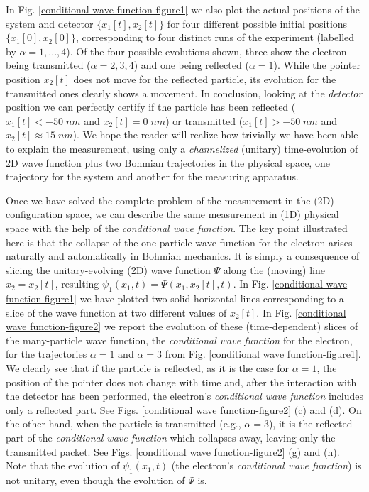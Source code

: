 \documentclass[nofootinbib, secnumarabic, amsmath, nobibnotes,11pt,aps,pra, floatfix]{revtex4-1}
\newcommand{\fref}[1]{Fig. \ref{#1}}
\begin{document}
In \fref{conditional wave function-figure1} we also plot the actual positions of the system and detector $\{x_1[t],x_2[t]\}$ for four different possible initial positions $\{x_1[0], x_2[0]\}$, corresponding to four distinct runs of the experiment (labelled by $\alpha=1,...,4$). Of the four possible evolutions shown, three show the electron being transmitted ($\alpha=2,3,4$) and one being reflected ($\alpha=1$). While the pointer position $x_2[t]$ does not move for the reflected particle, its evolution for the transmitted ones clearly shows a movement. In conclusion, looking at the \emph{detector} position we can perfectly certify if the particle has been reflected ($x_1[t]< -50\;nm$ and $x_2[t]=0\;nm $) or transmitted ($x_1[t]> -50\;nm$ and $x_2[t] \approx 15\;nm $). We hope the reader will realize how trivially we have been
able to explain the measurement, using only a \emph{channelized} (unitary) time-evolution of 2D wave function plus two Bohmian trajectories in the physical space, one trajectory for the system and another for the measuring apparatus. 

Once we have solved the complete problem of the measurement in the (2D) configuration space, we can describe the same measurement in (1D) physical space with the help of the \emph{conditional wave function}. The key point illustrated here is that the collapse of the one-particle wave function for the electron arises naturally and automatically in Bohmian mechanics.  It is simply a consequence of slicing the unitary-evolving (2D) wave function $\Psi$ along the (moving) line $x_2 = x_2[t]$, resulting $\psi_1(x_1,t)=\Psi(x_1,x_2[t],t)$. In \fref{conditional wave function-figure1} we have plotted two solid horizontal lines corresponding to a slice of the wave function at two different values of $x_2[t]$. In \fref{conditional wave function-figure2} we report the evolution of these (time-dependent) slices of the many-particle wave function, the \emph{conditional wave function} for the electron, for the trajectories $\alpha = 1$ and $\alpha = 3$ from \fref{conditional wave function-figure1}. We clearly see that if the particle is reflected, as it is the case for $\alpha = 1$, the position of the pointer does not change with time and, after the interaction with the detector has been performed, the electron's \emph{conditional wave function} includes only a reflected part. See Figs. \ref{conditional wave function-figure2} (c) and (d). On the other hand, when the particle is transmitted (e.g., $\alpha =3$), it is the reflected part of the \emph{conditional wave function} which collapses away, leaving only the transmitted packet.  See Figs. \ref{conditional wave  function-figure2} (g) and (h). Note that the evolution of $\psi_1(x_1,t)$ (the electron's \emph{conditional wave function}) is not unitary, even though the evolution of $\Psi$ is. 
\end{document}
